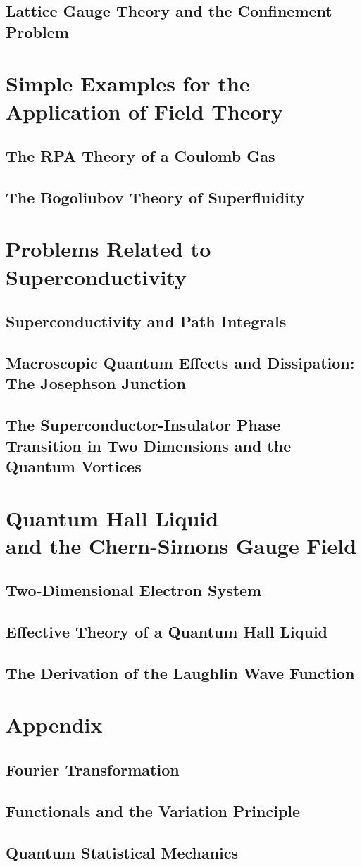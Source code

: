 \documentclass[twoside,11pt]{report}
\begin{document}
\section{Lattice Gauge Theory and the Confinement Problem}
\chapter{Simple Examples for the Application of Field Theory}
\section{The RPA Theory of a Coulomb Gas}
\section{The Bogoliubov Theory of Superfluidity}
\chapter{Problems Related to Superconductivity}\label{chap5}
\section{Superconductivity and Path Integrals}
\section{Macroscopic Quantum Effects and Dissipation: The Josephson Junction}
\section{The Superconductor-Insulator Phase Transition in Two Dimensions and the Quantum Vortices}
\chapter{Quantum Hall Liquid\\ and the Chern-Simons Gauge Field}
\section{Two-Dimensional Electron System}
\section{Effective Theory of a Quantum Hall Liquid}
\section{The Derivation of the Laughlin Wave Function}
\appendix
\chapter{Appendix}
\section{Fourier Transformation}
\section{Functionals and the Variation Principle}
\section{Quantum Statistical Mechanics}


\renewcommand{\bibname}{References}


\end{document}

